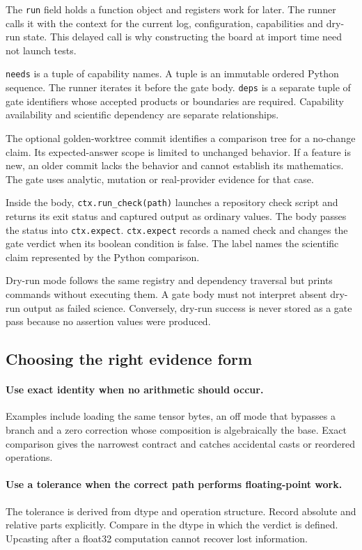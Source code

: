 \documentclass[10pt,aps,prd,twocolumn,nofootinbib]{revtex4-2}
\newcommand{\code}[1]{\texttt{#1}}
\begin{document}
The \code{run} field holds a function object and registers work for later.
The runner calls it with the context for the current log, configuration,
capabilities and dry-run state.  This delayed
call is why constructing the board at import time need not launch tests.

\code{needs} is a tuple of capability names.  A tuple is an immutable ordered
Python sequence.  The runner iterates it before the gate body.  \code{deps} is
a separate tuple of gate identifiers whose accepted products or boundaries
are required.  Capability availability and scientific dependency are
separate relationships.

The optional golden-worktree commit identifies a comparison tree for a
no-change claim.  Its expected-answer scope is limited to unchanged behavior.
If a feature is new, an older commit lacks the behavior and cannot establish its mathematics.
The gate uses analytic, mutation or real-provider evidence for that case.

Inside the body, \code{ctx.run\_check(path)} launches a repository check script
and returns its exit status and captured output as ordinary values.  The body
passes the status into \code{ctx.expect}.
\code{ctx.expect} records a named check and changes the gate verdict when its
boolean condition is false.  The label names the scientific claim represented
by the Python comparison.

Dry-run mode follows the same registry and dependency traversal but prints
commands without executing them.  A gate body must not interpret absent
dry-run output as failed science.  Conversely, dry-run success is never stored
as a gate pass because no assertion values were produced.

\subsection{Choosing the right evidence form}

\paragraph{Use exact identity when no arithmetic should occur.}
Examples include loading the same tensor bytes, an off mode that bypasses a
branch and a zero correction whose composition is algebraically the base.
Exact comparison gives the narrowest contract and catches accidental
casts or reordered operations.

\paragraph{Use a tolerance when the correct path performs floating-point work.}
The tolerance is derived from dtype and operation structure.  Record absolute
and relative parts explicitly.  Compare in the dtype in which the verdict is
defined.  Upcasting after a float32 computation cannot recover lost
information.
\end{document}

